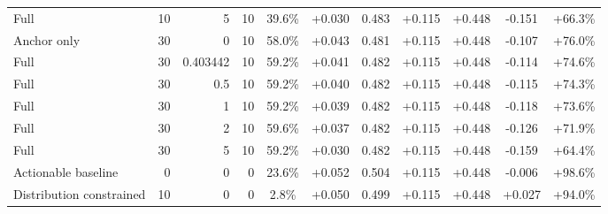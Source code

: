 \begin{table}[htbp]
\begin{tabular}{lrrrccccccc}
Full & 10 & 5 & 10 & 39.6\% & +0.030 & 0.483 & +0.115 & +0.448 & -0.151 & +66.3\% \\
Anchor only & 30 & 0 & 10 & 58.0\% & +0.043 & 0.481 & +0.115 & +0.448 & -0.107 & +76.0\% \\
Full & 30 & 0.403442 & 10 & 59.2\% & +0.041 & 0.482 & +0.115 & +0.448 & -0.114 & +74.6\% \\
Full & 30 & 0.5 & 10 & 59.2\% & +0.040 & 0.482 & +0.115 & +0.448 & -0.115 & +74.3\% \\
Full & 30 & 1 & 10 & 59.2\% & +0.039 & 0.482 & +0.115 & +0.448 & -0.118 & +73.6\% \\
Full & 30 & 2 & 10 & 59.6\% & +0.037 & 0.482 & +0.115 & +0.448 & -0.126 & +71.9\% \\
Full & 30 & 5 & 10 & 59.2\% & +0.030 & 0.482 & +0.115 & +0.448 & -0.159 & +64.4\% \\
Actionable baseline & 0 & 0 & 0 & 23.6\% & +0.052 & 0.504 & +0.115 & +0.448 & -0.006 & +98.6\% \\
Distribution constrained & 10 & 0 & 0 & 2.8\% & +0.050 & 0.499 & +0.115 & +0.448 & +0.027 & +94.0\% \\
\bottomrule
\end{tabular}
\end{table}